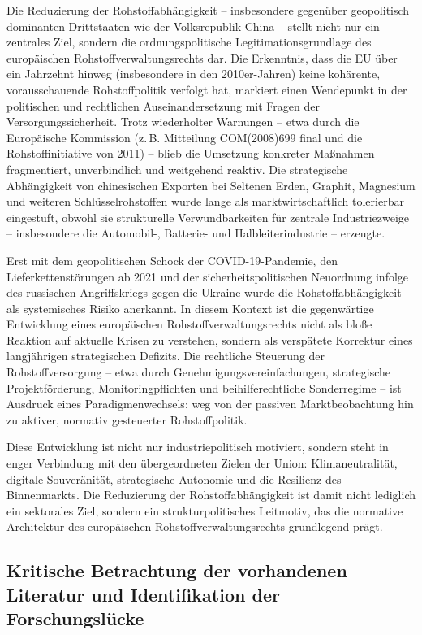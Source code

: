 \documentclass[12pt,a4paper,oneside]{book} %
\begin{document}
Die Reduzierung der Rohstoffabhängigkeit -- insbesondere gegenüber geopolitisch dominanten Drittstaaten wie der Volksrepublik China -- stellt nicht nur ein zentrales Ziel, sondern die ordnungspolitische Legitimationsgrundlage des europäischen Rohstoffverwaltungsrechts dar. Die Erkenntnis, dass die EU über ein Jahrzehnt hinweg (insbesondere in den 2010er-Jahren) keine kohärente, vorausschauende Rohstoffpolitik verfolgt hat, markiert einen Wendepunkt in der politischen und rechtlichen Auseinandersetzung mit Fragen der Versorgungssicherheit. Trotz wiederholter Warnungen – etwa durch die Europäische Kommission (z. B. Mitteilung COM(2008)699 final und die Rohstoffinitiative von 2011) – blieb die Umsetzung konkreter Maßnahmen fragmentiert, unverbindlich und weitgehend reaktiv. Die strategische Abhängigkeit von chinesischen Exporten bei Seltenen Erden, Graphit, Magnesium und weiteren Schlüsselrohstoffen wurde lange als marktwirtschaftlich tolerierbar eingestuft, obwohl sie strukturelle Verwundbarkeiten für zentrale Industriezweige – insbesondere die Automobil-, Batterie- und Halbleiterindustrie – erzeugte.

Erst mit dem geopolitischen Schock der COVID-19-Pandemie, den Lieferkettenstörungen ab 2021 und der sicherheitspolitischen Neuordnung infolge des russischen Angriffskriegs gegen die Ukraine wurde die Rohstoffabhängigkeit als systemisches Risiko anerkannt. In diesem Kontext ist die gegenwärtige Entwicklung eines europäischen Rohstoffverwaltungsrechts nicht als bloße Reaktion auf aktuelle Krisen zu verstehen, sondern als verspätete Korrektur eines langjährigen strategischen Defizits. Die rechtliche Steuerung der Rohstoffversorgung – etwa durch Genehmigungsvereinfachungen, strategische Projektförderung, Monitoringpflichten und beihilferechtliche Sonderregime – ist Ausdruck eines Paradigmenwechsels: weg von der passiven Marktbeobachtung hin zu aktiver, normativ gesteuerter Rohstoffpolitik.

Diese Entwicklung ist nicht nur industriepolitisch motiviert, sondern steht in enger Verbindung mit den übergeordneten Zielen der Union: Klimaneutralität, digitale Souveränität, strategische Autonomie und die Resilienz des Binnenmarkts. Die Reduzierung der Rohstoffabhängigkeit ist damit nicht lediglich ein sektorales Ziel, sondern ein strukturpolitisches Leitmotiv, das die normative Architektur des europäischen Rohstoffverwaltungsrechts grundlegend prägt.

\subsection{Kritische Betrachtung der vorhandenen Literatur und Identifikation der Forschungslücke}
\end{document}
